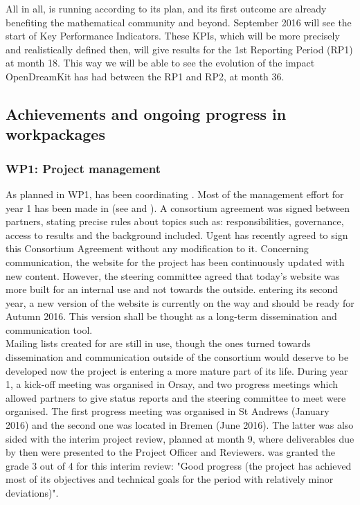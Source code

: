 \documentclass{deliverablereport}
\begin{document}
All in all, \ODK is running according to its plan, and its first
outcome are already benefiting the mathematical community and beyond. September 2016 will see the start of Key Performance Indicators.
These KPIs, which will be more precisely and realistically defined then, will give results for the 1st Reporting Period (RP1) at month 18.
This way we will be able to see the evolution of the impact OpenDreamKit has had between the RP1 and RP2, at month 36.


\subsection{Achievements and ongoing progress in workpackages}

\subsubsection{WP1: Project management}

As planned in WP1,  has been coordinating \ODK.
Most of the management effort for year 1 has been made in  (see  and ).
A consortium agreement was signed between partners, stating precise rules about topics such as: responsibilities,
 governance, access to results and the background included. Ugent has recently agreed to sign this Consortium Agreement without any modification to it.
 Concerning communication, the website for the project has been
continuously updated with new content. However, the
steering committee agreed that today's website was more built for an internal use and not towards the outside.
\ODK entering its second year, a new version of the website
 is currently on the way and should be ready for Autumn 2016. This version shall be thought as a long-term dissemination and communication tool.
\\Mailing lists created for \ODK are still in use, though the ones turned towards dissemination and communication outside of the
consortium would deserve to be developed now
the project is entering a more mature part of its life.
During year 1, a kick-off meeting was organised in Orsay, and two progress meetings which allowed partners to give status reports
and the steering committee to meet were organised.
 The first progress meeting was organised in St Andrews (January 2016) and the second one was located in Bremen (June 2016).
The latter was also sided with the interim project review, planned at month 9, where deliverables due by then were presented to
the Project Officer and Reviewers.
\ODK was granted the grade 3 out of 4 for this interim review: "Good progress (the project has achieved most of its objectives and technical goals for the
period with relatively minor deviations)".
\end{document}
